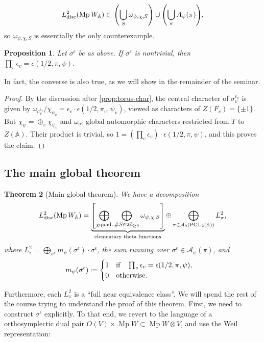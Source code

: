 \documentclass[11pt,a4paper,leqno]{article}
\let\mc\mathcal
\newcommand{\A}{\mathbb{A}}
\newcommand{\1}{\mathbbm{1}}
\newcommand{\Z}{\mathbb{Z}}
\newcommand*{\defeq}{\mathrel{\vcenter{\baselineskip0.5ex \lineskiplimit0pt
      \hbox{\scriptsize.}\hbox{\scriptsize.}}}%
  =}
\renewcommand{\tilde}{\widetilde}
\DeclareMathOperator{\disc}{disc}
\DeclareMathOperator{\Mp}{Mp}
\DeclareMathOperator{\PGL}{PGL}
\theoremstyle{plain}
\newtheorem{theorem}{Theorem}[section]
\newtheorem{prop}[theorem]{Proposition}
\theoremstyle{definition}
\theoremstyle{remark}
\numberwithin{equation}{section}
\begin{document}
\begin{equation}
  \label{eq:28}
L_{\disc}^{2}(\Mp W_{\A}) \subset \qty(\bigcup_{S} \omega_{\psi,\chi,S})\cup \qty(\bigcup_{\pi} A_{\psi}(\pi)),
\end{equation}
so $\omega_{\psi,\chi,S}$ is essentially the only counterexample.
\begin{prop}
  Let $\sigma^{\epsilon}$ be as above. If $\sigma^{\epsilon}$ is nontrivial, then $\prod_{v} \epsilon_{v}
  = \epsilon(1/2,\pi,\psi)$. 
\end{prop}
In fact, the converse is also true, as we will show in the remainder
of the seminar.
\begin{proof}
  By the discussion after \cref{prop:torus-char}, the central character of $\sigma_{v}^{\epsilon_{v}}$ is given by
  $\omega_{\sigma_{v}^{\epsilon_{v}}}/\chi_{\psi_{v}} = \epsilon_{v} \cdot \epsilon(1/2,\pi_{v},\psi_{v})$, viewed
  as characters of $Z(F_{v}) = \{\pm1\}$. But $\chi_{\psi}  = \oplus_{v} \chi_{\psi_{v}}$
  and $\omega_{\sigma^{\epsilon}}$ global automorphic characters restricted from
  $\tilde T$ to $Z(\A)$. Their
  product is trivial, so $1 = (\prod_{v} \epsilon_{v}) \cdot \epsilon(1/2,\pi,\psi)$, and this
  proves the claim.
\end{proof}

\subsection{The main global theorem}
\label{sec:main-global-theorem}
\begin{theorem}[Main global theorem]
  We have a decomposition
  \begin{equation}
    \label{eq:29}
    L^{2}_{\disc}(\Mp W_{\A}) = \underbrace{\qty[\bigoplus_{\chi
        {\text{quad.}}}\bigoplus_{\#S \in 2\Z_{\ge 0}} \omega_{\psi,\chi,S}]}_{\text{elementary
        theta functions}}\oplus \bigoplus_{\pi \in \mc A_{0}(\PGL_{2}(\A))}L^{2}_{\pi},
  \end{equation}
where $L_{\pi}^{2} = \bigoplus_{\sigma^{\epsilon}} m_{\psi}(\sigma^{\epsilon})\cdot \sigma^{\epsilon}$, the sum
running over $\sigma^{\epsilon} \in \mc A_{\psi}(\pi)$, and
\begin{equation}
  \label{eq:29}
m_{\psi}(\sigma^{\epsilon}) \defeq \begin{cases}
                     1 \qq{if} \prod_{v} \epsilon_{v} = \epsilon(1/2,\pi,\psi), \\ 0 \qq{otherwise.}
                    \end{cases}
\end{equation}
\end{theorem}
Furthermore, each $L^{2}_{\pi}$ is a ``full near equivalence class''.
We will spend the rest of the course trying to understand the proof of
this theorem. First, we need to construct $\sigma^{\epsilon}$ explicitly. To that
end, we revert to the language of a orthosymplectic dual pair
$O(V) \times \Mp W \subset \Mp W\otimes V$, and use the Weil representation:
\end{document}
